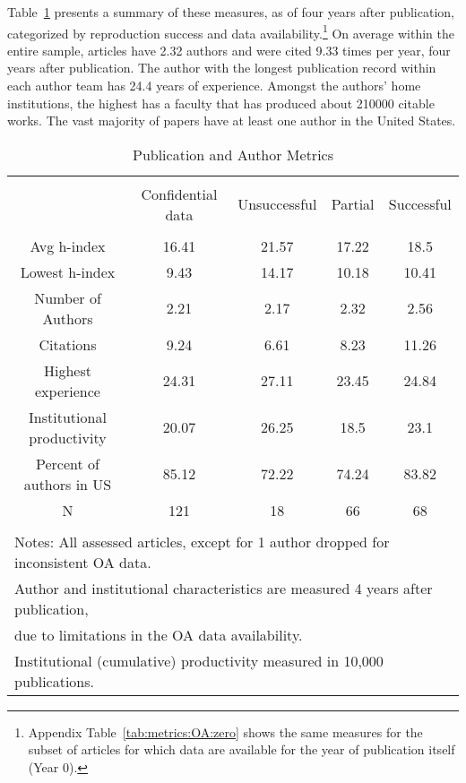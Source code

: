 \documentclass{cje} %
\theoremstyle{plain}%
\theoremstyle{definition}
\theoremstyle{remark}
\begin{document}
Table~\ref{tab:metrics:OA} presents a summary of these measures, as of four years after publication, categorized by reproduction success and data availability.\footnote{Appendix Table~\ref{tab:metrics:OA:zero} shows the same measures for the subset of articles for which data are available for the year of publication itself (Year 0).} On average within the entire sample, articles have 2.32 authors and were cited 9.33 times per year, four years after publication. The author with the longest publication record within each author team has 24.4 years of experience. Amongst the authors' home institutions, the highest has a faculty that has produced about 210000 citable works. The vast majority of papers have at least one author in the United States. 

\begin{table}\centering 
  \caption{Publication and Author Metrics} 
  \label{tab:metrics:OA} 
\begin{tabular}{@{\extracolsep{0.4pt}} ccccc} 
\\[-1.8ex]\hline 
\hline \\[-1.8ex] 
  & Confidential data & Unsuccessful & Partial & Successful \\ 
\hline \\[-1.8ex] 
Avg h-index & 16.41 & 21.57 & 17.22 & 18.5 \\ 
Lowest h-index & 9.43 & 14.17 & 10.18 & 10.41 \\ 
Number of Authors & 2.21 & 2.17 & 2.32 & 2.56 \\ 
Citations & 9.24 & 6.61 & 8.23 & 11.26 \\ 
Highest experience & 24.31 & 27.11 & 23.45 & 24.84 \\ 
Institutional productivity & 20.07 & 26.25 & 18.5 & 23.1 \\ 
Percent of authors in US & 85.12 & 72.22 & 74.24 & 83.82 \\ 
N & 121 & 18 & 66 & 68 \\ 
\hline \\[-1.8ex] 
\multicolumn{5}{l}{Notes: All assessed articles, except for 1 author dropped for inconsistent OA data.} \\ 
\multicolumn{5}{l}{Author and institutional characteristics are measured 4 years after publication, } \\ 
\multicolumn{5}{l}{due to limitations in the OA data availability.} \\ 
\multicolumn{5}{l}{Institutional (cumulative) productivity measured in 10,000 publications.} \\ 
\end{tabular} 
\end{table} 
\end{document}
